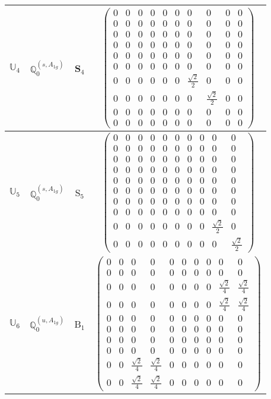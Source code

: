 \documentclass[fleqn,10pt,landscape]{article}
\begin{document}
\begin{itemize}
\begin{center}
\begin{longtable}{c|c|c|c}
$ \mathbb{U}_{4} $ & $\mathbb{Q}_{0}^{(s,A_{1g})}$ & S$_{4}$ & $\begin{pmatrix} 0 & 0 & 0 & 0 & 0 & 0 & 0 & 0 & 0 & 0 \\ 0 & 0 & 0 & 0 & 0 & 0 & 0 & 0 & 0 & 0 \\ 0 & 0 & 0 & 0 & 0 & 0 & 0 & 0 & 0 & 0 \\ 0 & 0 & 0 & 0 & 0 & 0 & 0 & 0 & 0 & 0 \\ 0 & 0 & 0 & 0 & 0 & 0 & 0 & 0 & 0 & 0 \\ 0 & 0 & 0 & 0 & 0 & 0 & 0 & 0 & 0 & 0 \\ 0 & 0 & 0 & 0 & 0 & 0 & \frac{\sqrt{2}}{2} & 0 & 0 & 0 \\ 0 & 0 & 0 & 0 & 0 & 0 & 0 & \frac{\sqrt{2}}{2} & 0 & 0 \\ 0 & 0 & 0 & 0 & 0 & 0 & 0 & 0 & 0 & 0 \\ 0 & 0 & 0 & 0 & 0 & 0 & 0 & 0 & 0 & 0 \end{pmatrix}$ \\ \hline
$ \mathbb{U}_{5} $ & $\mathbb{Q}_{0}^{(s,A_{1g})}$ & S$_{5}$ & $\begin{pmatrix} 0 & 0 & 0 & 0 & 0 & 0 & 0 & 0 & 0 & 0 \\ 0 & 0 & 0 & 0 & 0 & 0 & 0 & 0 & 0 & 0 \\ 0 & 0 & 0 & 0 & 0 & 0 & 0 & 0 & 0 & 0 \\ 0 & 0 & 0 & 0 & 0 & 0 & 0 & 0 & 0 & 0 \\ 0 & 0 & 0 & 0 & 0 & 0 & 0 & 0 & 0 & 0 \\ 0 & 0 & 0 & 0 & 0 & 0 & 0 & 0 & 0 & 0 \\ 0 & 0 & 0 & 0 & 0 & 0 & 0 & 0 & 0 & 0 \\ 0 & 0 & 0 & 0 & 0 & 0 & 0 & 0 & 0 & 0 \\ 0 & 0 & 0 & 0 & 0 & 0 & 0 & 0 & \frac{\sqrt{2}}{2} & 0 \\ 0 & 0 & 0 & 0 & 0 & 0 & 0 & 0 & 0 & \frac{\sqrt{2}}{2} \end{pmatrix}$ \\ \hline
$ \mathbb{U}_{6} $ & $\mathbb{Q}_{0}^{(u,A_{1g})}$ & B$_{1}$ & $\begin{pmatrix} 0 & 0 & 0 & 0 & 0 & 0 & 0 & 0 & 0 & 0 \\ 0 & 0 & 0 & 0 & 0 & 0 & 0 & 0 & 0 & 0 \\ 0 & 0 & 0 & 0 & 0 & 0 & 0 & 0 & \frac{\sqrt{2}}{4} & \frac{\sqrt{2}}{4} \\ 0 & 0 & 0 & 0 & 0 & 0 & 0 & 0 & \frac{\sqrt{2}}{4} & \frac{\sqrt{2}}{4} \\ 0 & 0 & 0 & 0 & 0 & 0 & 0 & 0 & 0 & 0 \\ 0 & 0 & 0 & 0 & 0 & 0 & 0 & 0 & 0 & 0 \\ 0 & 0 & 0 & 0 & 0 & 0 & 0 & 0 & 0 & 0 \\ 0 & 0 & 0 & 0 & 0 & 0 & 0 & 0 & 0 & 0 \\ 0 & 0 & \frac{\sqrt{2}}{4} & \frac{\sqrt{2}}{4} & 0 & 0 & 0 & 0 & 0 & 0 \\ 0 & 0 & \frac{\sqrt{2}}{4} & \frac{\sqrt{2}}{4} & 0 & 0 & 0 & 0 & 0 & 0 \end{pmatrix}$ \\

\end{longtable}
\end{center}
\end{itemize}
\end{document}
